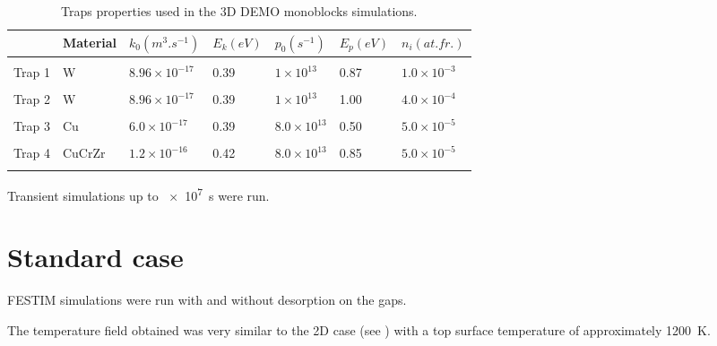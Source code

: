 \begin{table}
    \centering
    \begin{tabular}{L{1.5cm} L{1.5cm} R{1.6cm} R{1.1cm} R{1.6cm} R{1.1cm} R{2cm}}
         & Material & $k_0 (\si{m^3.s^{-1}})$ &  $E_k (\si{eV})$ & $p_0 (\si{s^{-1}})$ & $E_p (\si{eV})$ & $n_i (\si{at.fr.})$ \\
        \hline
        \\
        Trap 1 & W & $8.96 \times 10^{-17}$ & 0.39 & $1 \times 10^{13}$& 0.87 & $1.0 \times 10^{-3}$ \\
        \\
        Trap 2 & W & $8.96 \times 10^{-17}$ & 0.39 & $1 \times 10^{13}$& 1.00 & $4.0 \times 10^{-4}$ \\
        \\
        Trap 3 & Cu & $6.0 \times 10^{-17}$ & 0.39 & $8.0 \times 10^{13}$ & 0.50 &$5.0 \times 10^{-5}$\\
        \\
        Trap 4 & CuCrZr & $1.2\times 10^{-16}$ & 0.42 & $8.0 \times 10^{13}$ & 0.85 &$5.0 \times 10^{-5}$\\
        \\
    \end{tabular}
    \caption{Traps properties used in the 3D DEMO monoblocks simulations.}
\end{table}

Transient simulations up to \SI{e7}{s} were run.

\section{Standard case}

FESTIM simulations were run with and without desorption on the gaps.


The temperature field obtained was very similar to the 2D case (see ) with a top surface temperature of approximately \SI{1200}{K}.

